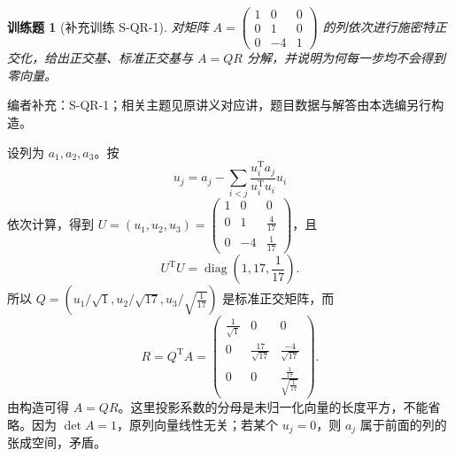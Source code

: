\documentclass[UTF8,12pt,a4paper,fontset=fandol]{ctexart}
\newtheorem{exercise}{训练题}[section]
\begin{document}
\begin{exercise}[补充训练 S-QR-1]\label{prob:S-QR-1}
对矩阵 $A=\begin{pmatrix}1&0&0\\0&1&0\\0&-4&1\end{pmatrix}$ 的列依次进行施密特正交化，给出正交基、标准正交基与 $A=QR$ 分解，并说明为何每一步均不会得到零向量。
\end{exercise}
\noindent 编者补充：S-QR-1；相关主题见原讲义对应讲，题目数据与解答由本选编另行构造。
\begin{solve}
设列为 $a_1,a_2,a_3$。按
\[u_j=a_j-\sum_{i<j}\frac{u_i^{\mathrm T}a_j}{u_i^{\mathrm T}u_i}u_i\]
依次计算，得到 $U=(u_1,u_2,u_3)=\begin{pmatrix}1&0&0\\0&1&\frac{4}{17}\\0&-4&\frac{1}{17}\end{pmatrix}$，且
\[U^{\mathrm T}U=\operatorname{diag}(1,17,\frac{1}{17}).\]
所以 $Q=\left(u_1/\sqrt{1},u_2/\sqrt{17},u_3/\sqrt{\frac{1}{17}}\right)$ 是标准正交矩阵，而
\[R=Q^{\mathrm T}A=\begin{pmatrix}\frac{1}{\sqrt{1}}&0&0\\0&\frac{17}{\sqrt{17}}&\frac{-4}{\sqrt{17}}\\0&0&\frac{\frac{1}{17}}{\sqrt{\frac{1}{17}}}\end{pmatrix}.\]
由构造可得 $A=QR$。这里投影系数的分母是未归一化向量的长度平方，不能省略。因为 $\det A=1$，原列向量线性无关；若某个 $u_j=0$，则 $a_j$ 属于前面的列的张成空间，矛盾。
\end{solve}
\end{document}
